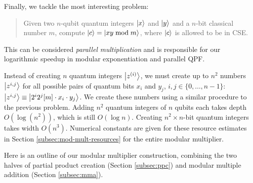 \documentclass[twoside]{article}
\begin{document}

Finally, we tackle the most interesting problem:
\begin{quote}
Given two $n$-qubit quantum integers $\left\vert{x}\right\rangle$ and
$\left\vert{y}\right\rangle$ and a $n$-bit classical number
$m$,
compute $\left\vert{c}\right\rangle = \left\vert{xy \bmod m}\right\rangle$,
where $\left\vert{c}\right\rangle$ is allowed to be in CSE.
\end{quote}

This can be considered \emph{parallel multiplication} and is responsible
for our logarithmic speedup in modular exponentiation and parallel QPF.


Instead of creating $n$ quantum integers $\left\vert{z^{(i)}}\right\rangle$, we must create
up to $n^2$ numbers
$\left\vert{z^{i,j}}\right\rangle$ for all possible pairs of quantum bits $x_i$ and $y_j$,
$i,j \in \{0,\ldots,n-1\}$:
$\left\vert{z^{i,j}}\right\rangle \equiv \left\vert{2^i2^j[m]\cdot x_i \cdot y_j}\right\rangle$.
We create these numbers using a similar procedure to the previous problem.
Adding $n^2$ quantum integers of $n$ qubits each takes depth
$O(\log(n^2))$, which is still $O(\log n)$.
Creating $n^2\times n$-bit quantum integers takes width $O(n^3)$.
Numerical constants are given for these resource estimates in
Section \ref{subsec:mod-mult-resources} for the entire modular multiplier.

Here is an outline of our modular multiplier construction, combining the
two halves of partial product creation (Section \ref{subsec:ppc}) and
modular multiple addition (Section \ref{subsec:mma}).
\end{document}

